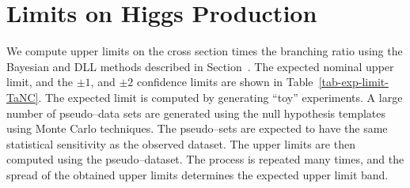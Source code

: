 \section{Limits on Higgs Production}
We compute upper limits on the cross section times the branching ratio using the
Bayesian and DLL methods described in Section~\label{sec:statmethod}.  The
expected nominal upper limit, and the $\pm1$, and $\pm2$ confidence limits are
shown in Table~\ref{tab-exp-limit-TaNC}.  The expected limit is computed by
generating ``toy'' experiments.  A large number of pseudo--data sets are
generated using the null hypothesis templates  using Monte Carlo techniques.  The pseudo--sets are expected to have
the same statistical sensitivity as the observed dataset.  The upper limits are
then computed using the pseudo--dataset.   The process is repeated many times,
and the spread of the obtained upper limits determines the expected upper limit
band.
